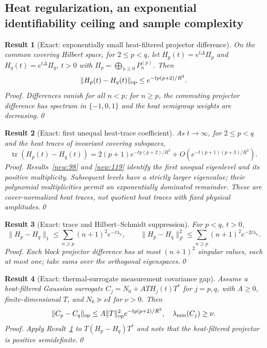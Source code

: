 \documentclass[aps,prd,onecolumn,notitlepage,groupedaddress,11pt]{revtex4-2}
\newtheorem{result}{Result}
\begin{document}
\subsection{Heat regularization, an exponential identifiability ceiling and sample complexity}
\begin{result}[\textsf{Exact}: exponentially small heat-filtered projector difference]\label{new:125}
On the common covering Hilbert space, for $2\le p<q$, let $H_p(t)=e^{t\Delta}\Pi_p$ and $H_q(t)=e^{t\Delta}\Pi_q$, $t>0$ with $\Pi_p=\bigoplus_{n\ge0}P_n^{(p)}$. Then
\begin{equation}\label{new:eq125}
\|H_p(t)-H_q(t)\|_{\rm op}\le e^{-t p(p+2)/R^2}.
\end{equation}
\textit{Proof.} Differences vanish for all $n<p$; for $n\ge p$, the commuting projector difference has spectrum in $\{-1,0,1\}$ and the heat semigroup weights are decreasing.\qed
\end{result}
\begin{result}[\textsf{Exact}: first unequal heat-trace coefficient]\label{new:126}
As $t\to\infty$, for $2\le p<q$ and the heat traces of invariant covering subspaces,
\begin{equation}\label{new:eq126}
\operatorname{tr}(H_p(t)-H_q(t))=2(p+1)e^{-t p(p+2)/R^2}+O(e^{-t(p+1)(p+3)/R^2}).
\end{equation}
\textit{Proof.} Results~\ref{new:98} and \ref{new:119} identify the first unequal eigenlevel and its positive multiplicity. Subsequent levels have a strictly larger eigenvalue; their polynomial multiplicities permit an exponentially dominated remainder. These are \emph{cover-normalized} heat traces, not quotient heat traces with fixed physical amplitudes.\qed
\end{result}
\begin{result}[\textsf{Exact}: trace and Hilbert--Schmidt suppression]\label{new:127}
For $p<q$, $t>0$,
\begin{equation}\label{new:eq127}
\|H_p-H_q\|_1\le\sum_{n\ge p}(n+1)^2e^{-t\lambda_n},\qquad
\|H_p-H_q\|_F^2\le\sum_{n\ge p}(n+1)^2e^{-2t\lambda_n}.
\end{equation}
\textit{Proof.} Each block projector difference has at most $(n+1)^2$ singular values, each at most one; take sums over the orthogonal eigenspaces.\qed
\end{result}
\begin{result}[\textsf{Exact}: thermal-surrogate measurement covariance gap]\label{new:128}
Assume a \emph{heat-filtered Gaussian surrogate} $C_j=N_0+A T H_j(t)T^*$ for $j=p,q$, with $A\ge0$, finite-dimensional $T$, and $N_0\succeq\nu I$ for $\nu>0$. Then
\begin{equation}\label{new:eq128}
\|C_p-C_q\|_{\rm op}\le A\|T\|_{\rm op}^2e^{-tp(p+2)/R^2},\quad \lambda_{\min}(C_j)\ge\nu.
\end{equation}
\textit{Proof.} Apply Result~\ref{new:125} to $T(H_p-H_q)T^*$ and note that the heat-filtered projector is positive semidefinite.\qed
\end{result}
\end{document}
